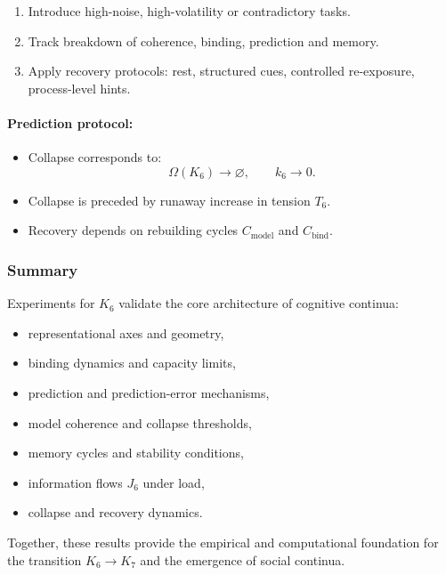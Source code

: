 \begin{enumerate}
    \item Introduce high-noise, high-volatility or contradictory tasks.
    \item Track breakdown of coherence, binding, prediction and memory.
    \item Apply recovery protocols: rest, structured cues,
          controlled re-exposure, process-level hints.
\end{enumerate}

\paragraph{Prediction protocol:}

\begin{itemize}
    \item Collapse corresponds to:
          \[
             \Omega(K_6) \rightarrow \varnothing,
             \qquad k_6 \rightarrow 0.
          \]
    \item Collapse is preceded by runaway increase in tension $T_6$.
    \item Recovery depends on rebuilding cycles $C_{\mathrm{model}}$
          and $C_{\mathrm{bind}}$.
\end{itemize}



\subsubsection{Summary}

Experiments for $K_6$ validate the core architecture of cognitive continua:

\begin{itemize}
    \item representational axes and geometry,
    \item binding dynamics and capacity limits,
    \item prediction and prediction-error mechanisms,
    \item model coherence and collapse thresholds,
    \item memory cycles and stability conditions,
    \item information flows $J_6$ under load,
    \item collapse and recovery dynamics.
\end{itemize}

Together, these results provide the empirical and computational
foundation for the transition $K_6 \rightarrow K_7$ and the
emergence of social continua.
